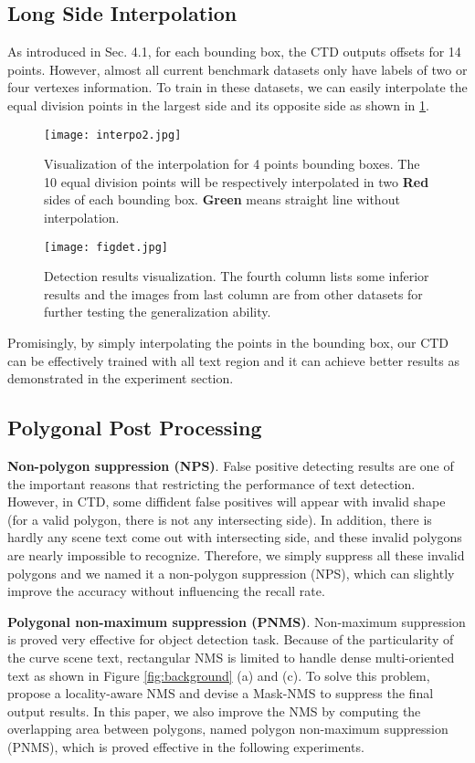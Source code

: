 \documentclass[10pt,twocolumn,letterpaper]{article}
\begin{document}
\subsection{Long Side Interpolation}
As introduced in Sec. 4.1, for each bounding box, the CTD outputs offsets for 14 points. However, almost all current benchmark datasets only have labels of two or four vertexes information. To train in these datasets, we can easily interpolate the equal division points in the largest side and its opposite side as shown in \ref{fig:interpo}.
\begin{figure}[htb]
  \centering
  \centerline{\texttt{[image: interpo2.jpg]}}
  \caption{Visualization of the interpolation for 4 points bounding boxes. The 10 equal division points will be respectively interpolated in two {\bf{Red}} sides of each bounding box. {\bf{Green}} means straight line without interpolation.}\label{fig:interpo}
\end{figure}

\begin{figure*}[htb]
  \centering
  \centerline{\texttt{[image: figdet.jpg]}}
  \caption{Detection results visualization. The fourth column lists some inferior results and the images from last column are from other datasets for further testing the generalization ability.}\label{fig:det:oth:cur}
\end{figure*}

Promisingly, by simply interpolating the points in the bounding box, our CTD can be effectively trained with all text region and it can achieve better results as demonstrated in the experiment section.

\subsection{Polygonal Post Processing}
{\bf{Non-polygon suppression (NPS)}}.
False positive detecting results are one of the important reasons that restricting the performance of text detection. However, in CTD, some diffident false positives will appear with invalid shape (for a valid polygon, there is not any intersecting side). In addition, there is hardly any scene text come out with intersecting side, and these invalid polygons are nearly impossible to recognize. Therefore, we simply suppress all these invalid polygons and we named it a non-polygon suppression (NPS), which can slightly improve the accuracy without influencing the recall rate.

{\bf{Polygonal non-maximum suppression (PNMS)}}.
Non-maximum suppression \cite{Neubeck2006Efficient} is proved very effective for object detection task. Because of the particularity of the curve scene text, rectangular NMS is limited to handle dense multi-oriented text as shown in Figure \ref{fig:background} (a) and (c). To solve this problem, \cite{zhou2017east} propose a locality-aware NMS and \cite{dai2017fused} devise a Mask-NMS to suppress the final output results. In this paper, we also improve the NMS by computing the overlapping area between polygons, named polygon non-maximum suppression (PNMS), which is proved effective in the following experiments.
\end{document}
